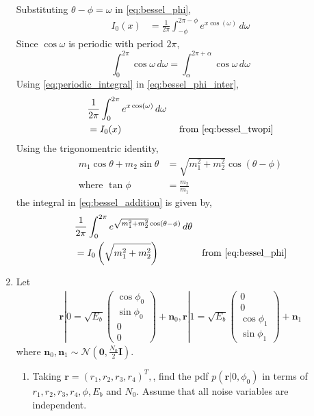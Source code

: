\documentclass[journal,8pt,onecolumn]{IEEEtran}
\providecommand{\brak}[1]{\ensuremath{\left(#1\right)}}
\newcommand{\myvec}[1]{\ensuremath{\begin{pmatrix}#1\end{pmatrix}}}
\begin{document}
\begin{enumerate}
\begin{align*}
\end{align*}
Substituting $\theta-\phi = \omega$ in \eqref{eq:bessel_phi},
\begin{align}
	\label{eq:bessel_phi_inter}
	I_{0}(x) &= \frac{1}{2\pi}\int_{-\phi}^{2\pi-\phi}e^{x\cos\brak{\omega}}\,d\omega
\end{align}
Since $\cos \omega$ is periodic with period $2\pi$,
\begin{equation}
	\int_{0}^{2\pi} \cos \omega \,d\omega = \int_{\alpha}^{2\pi+\alpha} \cos \omega \,d\omega
	\label{eq:periodic_integral}
\end{equation}
Using \eqref{eq:periodic_integral} in \eqref{eq:bessel_phi_inter},
\begin{align*}
	& \frac{1}{2\pi}\int_{0}^{2\pi}e^{x\cos\brak{\omega}}\,d\omega\\
	&= I_{0}(x) &\text{ from \eqref{eq:bessel_twopi}}
\end{align*}
Using the trigonomentric identity,
\begin{align}
	\label{eq:trig_identity_ab}
	m_1\cos\theta + m_2\sin\theta &= \sqrt{m_1^2+m_2^2}\cos\brak{\theta-\phi}\\
	\nonumber
	\text{where } \tan \phi &= \frac{m_2}{m_1} 
\end{align}
the integral in \eqref{eq:bessel_addition} is given by,
\begin{align*}
	&\frac{1}{2\pi}\int_{0}^{2\pi}e^{\sqrt{m_1^2+m_2^2}\cos\brak{\theta-\phi}}\,d\theta \\
	&= I_{0}\brak{\sqrt{m_1^2+m_2^2}} &\text{from \eqref{eq:bessel_phi}} 
\end{align*}
\item
Let
%
\begin{align}
\mathbf{r}|0= \sqrt{E_b}
\myvec{
\cos \phi_0\\
\sin \phi_0 \\
0\\
0
}
+\mathbf{n}_0,
\mathbf{r}|1= \sqrt{E_b}
\myvec{
0\\
0 \\
\cos \phi_1\\
\sin \phi_1 
}
+\mathbf{n}_1
\end{align}
%
where $\mathbf{n}_0,\mathbf{n}_1\sim \mathcal{N}\brak{\mathbf{0}, \frac{N_0}{2}\mathbf{I}}$.
%
\begin{enumerate}[label=(\alph{enumii})]
\item Taking $\mathbf{r} = \brak{r_1,r_2,r_3,r_4}^{T},$, find the pdf $p\brak{\mathbf{r}|0,\phi_0}$ in
terms of $r_1,r_2,r_3,r_4,\phi,E_b$ and $N_0$. Assume that all noise variables are independent.\\

\end{enumerate}
\end{enumerate}
\end{document}
